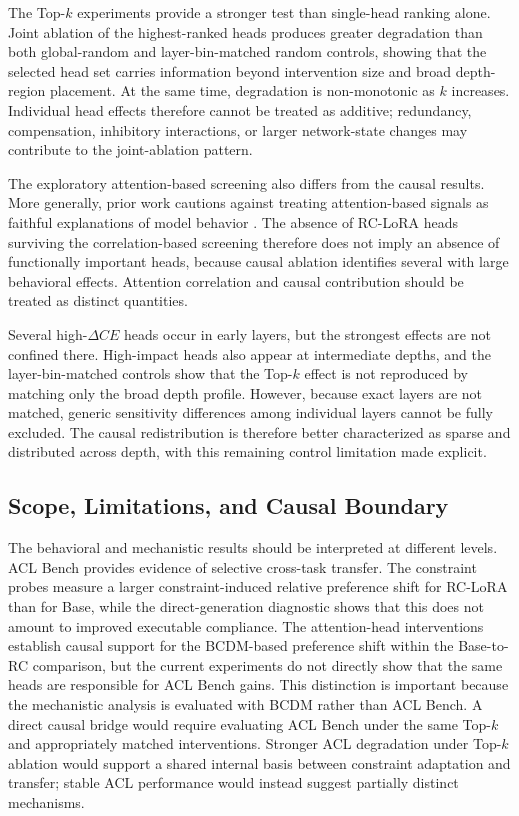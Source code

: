 The Top-$k$ experiments provide a stronger test than single-head ranking alone. Joint ablation of the highest-ranked heads produces greater degradation than both global-random and layer-bin-matched random controls, showing that the selected head set carries information beyond intervention size and broad depth-region placement. At the same time, degradation is non-monotonic as $k$ increases. Individual head effects therefore cannot be treated as additive; redundancy, compensation, inhibitory interactions, or larger network-state changes may contribute to the joint-ablation pattern.

The exploratory attention-based screening also differs from the causal results. More generally, prior work cautions against treating attention-based signals as faithful explanations of model behavior \cite{jain2019attention}. The absence of RC-LoRA heads surviving the correlation-based screening therefore does not imply an absence of functionally important heads, because causal ablation identifies several with large behavioral effects. Attention correlation and causal contribution should be treated as distinct quantities.

Several high-$\Delta CE$ heads occur in early layers, but the strongest effects are not confined there. High-impact heads also appear at intermediate depths, and the layer-bin-matched controls show that the Top-$k$ effect is not reproduced by matching only the broad depth profile. However, because exact layers are not matched, generic sensitivity differences among individual layers cannot be fully excluded. The causal redistribution is therefore better characterized as sparse and distributed across depth, with this remaining control limitation made explicit.

\subsection{Scope, Limitations, and Causal Boundary}
\label{sec:limitations}

The behavioral and mechanistic results should be interpreted at different levels. ACL Bench provides evidence of selective cross-task transfer. The constraint probes measure a larger constraint-induced relative preference shift for RC-LoRA than for Base, while the direct-generation diagnostic shows that this does not amount to improved executable compliance. The attention-head interventions establish causal support for the BCDM-based preference shift within the Base-to-RC comparison, but the current experiments do not directly show that the same heads are responsible for ACL Bench gains. This distinction is important because the mechanistic analysis is evaluated with BCDM rather than ACL Bench. A direct causal bridge would require evaluating ACL Bench under the same Top-$k$ and appropriately matched interventions. Stronger ACL degradation under Top-$k$ ablation would support a shared internal basis between constraint adaptation and transfer; stable ACL performance would instead suggest partially distinct mechanisms.

